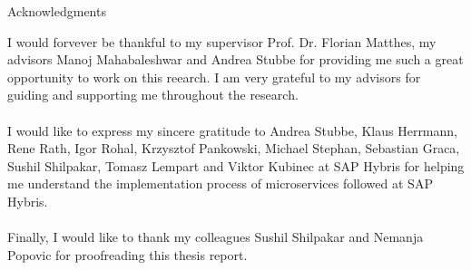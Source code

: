 \thispagestyle{empty}

\vspace*{2cm}

\begin{center}
{ Acknowledgments}
\end{center}

\vspace{1cm}

I would forvever be thankful to  my supervisor Prof. Dr. Florian Matthes, my advisors Manoj Mahabaleshwar and Andrea Stubbe for providing me such a great opportunity to work on this reearch. I am very grateful to my advisors for guiding and supporting me throughout the research.
\\
\\
I would like to express my sincere gratitude to Andrea Stubbe, Klaus Herrmann, Rene Rath, Igor Rohal, Krzysztof Pankowski, Michael Stephan, Sebastian Graca, Sushil Shilpakar, Tomasz Lempart and Viktor Kubinec at SAP Hybris for helping me understand the implementation process of microservices followed at SAP Hybris.
\\
\\
Finally, I would like to thank my colleagues Sushil Shilpakar and Nemanja Popovic for proofreading this thesis report.

\cleardoublepage{}
